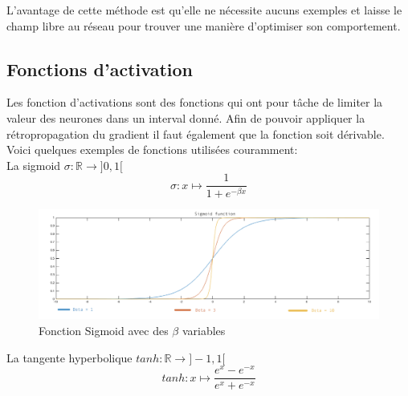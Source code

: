 \documentclass{article}
\begin{document}
L'avantage de cette méthode est qu'elle ne nécessite aucuns exemples et laisse le champ libre au réseau pour trouver une manière d'optimiser son comportement.\\

\subsection{Fonctions d'activation}

Les fonction d'activations sont des fonctions qui ont pour tâche de limiter la valeur des neurones dans un interval donné. Afin de pouvoir appliquer la rétropropagation du gradient il faut également que la fonction soit dérivable.
Voici quelques exemples de fonctions utilisées couramment:\\

La sigmoid $\sigma : \mathbb{R} \rightarrow ]0, 1[$
\begin{equation}
	\sigma : x \mapsto \frac{1}{1 + e^{-\beta x}}
\end{equation}

\begin{figure}[h]
\begin{center}
	\includegraphics[scale=0.4]{sigmoid.png} 
	\caption{Fonction Sigmoid avec des $\beta$ variables}
\end{center}
\end{figure}

La tangente hyperbolique $tanh : \mathbb{R} \rightarrow ]-1, 1[$
\begin{equation}
	tanh : x \mapsto \frac{e^x - e^{-x}}{e^x + e^{-x}}
\end{equation}
\end{document}
